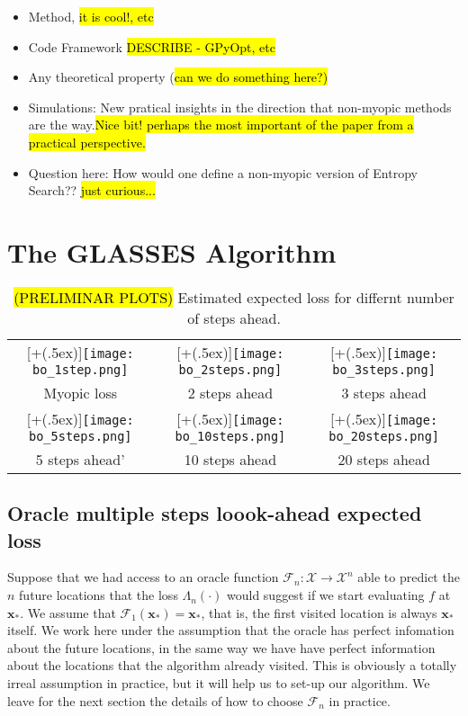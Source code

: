\documentclass[twoside]{article}
\newcommand{\bx}{\textbf{x}}
\newcommand{\future}{\mathcal{F}}
\newcommand*{\addheight}[2][.5ex]{%
  \raisebox{0pt}[\dimexpr\height+(#1)\relax]{#2}%
}
\begin{document}
\begin{itemize}
\item Method, \hl{it is cool!, etc}
\item Code Framework \hl{DESCRIBE - GPyOpt, etc}
\item Any theoretical property (\hl{can we do something here?)}
\item Simulations: New pratical insights in the direction that non-myopic methods are the way.\hl{Nice bit! perhaps the most important of the paper from a practical perspective.}
\item Question here: How would one define a non-myopic version of Entropy Search?? \hl{just curious...}
\end{itemize}




 \section{The GLASSES  Algorithm}


\begin{table*}
\begin{tabular}{ccc}
      \addheight{\texttt{[image: bo\_1step.png]}} &
      \addheight{\texttt{[image: bo\_2steps.png]}}  &
      \addheight{\texttt{[image: bo\_3steps.png]}}\\
      \small Myopic loss &  \small 2 steps ahead & \small 3 steps ahead \\
      \addheight{\texttt{[image: bo\_5steps.png]}} &
      \addheight{\texttt{[image: bo\_10steps.png]}}  &
      \addheight{\texttt{[image: bo\_20steps.png]}}\\
      \small \small 5 steps ahead' & \small 10 steps ahead & \small 20 steps ahead \\
\end{tabular}\caption{\hl{(PRELIMINAR PLOTS)} Estimated expected loss for differnt number of steps ahead.}
\end{table*}

\subsection{Oracle multiple steps loook-ahead expected loss}
Suppose that  we had access to an oracle function $\future_{n}: {\mathcal X}\rightarrow  {\mathcal X}^n$ able to predict the $n$ future  locations that the loss $\Lambda_n(\cdot)$ would suggest if we start evaluating $f$ at $\bx_*$. We assume that $\future_{1}(\bx_*)=\bx_*$, that is, the first visited location is always $\bx_*$ itself. We work here under the assumption that the oracle has perfect infomation about the future locations, in the same way we have have perfect information about the locations that the algorithm already visited. This is obviously a totally irreal assumption in practice, but it will help us to set-up our algorithm. We leave for the next section the details of how to choose $\future_{n}$ in practice. 
\end{document}
